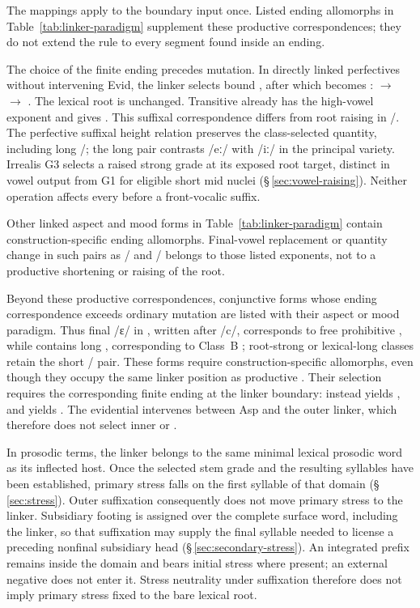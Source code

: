The mappings apply to the boundary input once. Listed ending allomorphs in
Table~\ref{tab:linker-paradigm} supplement these productive correspondences;
they do not extend the rule to every segment found inside an ending.

The choice of the finite ending precedes mutation. In directly linked
perfectives without intervening Evid, the linker selects
bound , after which  becomes
:  $\rightarrow$ 
$\rightarrow$ . The lexical root is unchanged. Transitive
 already has the high-vowel exponent and gives
. This suffixal correspondence differs from root raising in
/. The perfective suffixal height relation
preserves the class-selected quantity, including long /;
the long pair contrasts /eː/ with /iː/ in the principal variety.
Irrealis G3 selects a raised strong grade at its exposed root target,
distinct in vowel output from G1 for eligible short mid nuclei
(§\,\ref{sec:vowel-raising}).
Neither operation affects every  before a front-vocalic suffix.

Other linked aspect and mood forms in Table~\ref{tab:linker-paradigm} contain
construction-specific ending allomorphs. Final-vowel replacement or quantity
change in such pairs as / and
/ belongs to those listed exponents, not to a
productive shortening or raising of the root.

Beyond these productive correspondences, conjunctive forms whose ending
correspondence exceeds ordinary mutation are listed with their aspect or mood paradigm. Thus final /ɛ/ in
, written  after /c/, corresponds to free prohibitive , while
 contains long , corresponding to
Class~B ; root-strong or lexical-long classes retain the
short / pair. These
forms require construction-specific allomorphs, even though they occupy the same
linker position as productive . Their selection requires the
corresponding finite ending at the linker boundary: 
instead yields , and  yields
. The evidential intervenes between Asp and the outer
linker, which therefore does not select inner  or
.

In prosodic terms, the linker  belongs to the same minimal lexical
prosodic word as its inflected host. Once the selected stem grade and the resulting syllables
have been established, primary stress falls on the first syllable of that
domain (§\,\ref{sec:stress}). Outer suffixation consequently does not move
primary stress to the linker. Subsidiary footing is assigned over the complete
surface word, including the linker, so that suffixation may supply the final
syllable needed to license a preceding nonfinal subsidiary head
(§\,\ref{sec:secondary-stress}). An integrated prefix remains inside the
domain and bears initial stress where present; an external negative
 does not enter it. Stress neutrality under suffixation therefore
does not imply primary stress fixed to the bare lexical root.

